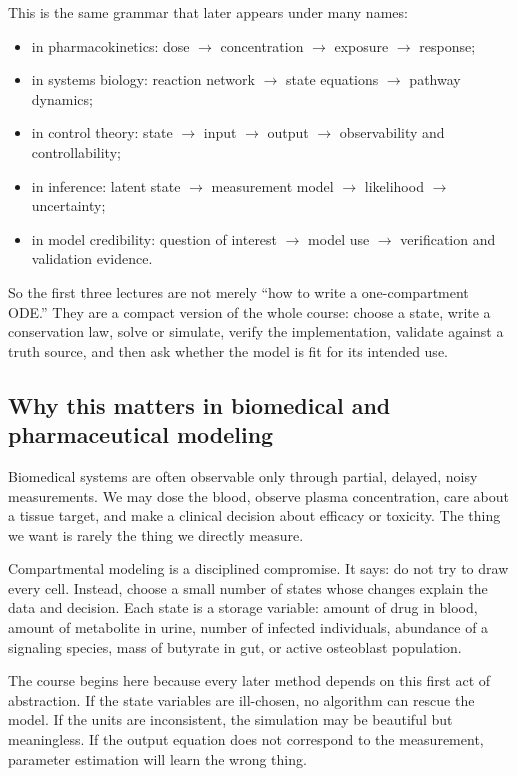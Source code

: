 \documentclass[a4paper]{article}
\begin{document}
This is the same grammar that later appears under many names:
\begin{itemize}[leftmargin=2em]
  \item in pharmacokinetics: dose \(\to\) concentration \(\to\) exposure \(\to\) response;
  \item in systems biology: reaction network \(\to\) state equations \(\to\) pathway dynamics;
  \item in control theory: state \(\to\) input \(\to\) output \(\to\) observability and controllability;
  \item in inference: latent state \(\to\) measurement model \(\to\) likelihood \(\to\) uncertainty;
  \item in model credibility: question of interest \(\to\) model use \(\to\) verification and validation evidence.
\end{itemize}

So the first three lectures are not merely ``how to write a one-compartment ODE.'' They are a compact version of the whole course: choose a state, write a conservation law, solve or simulate, verify the implementation, validate against a truth source, and then ask whether the model is fit for its intended use.

\subsection{Why this matters in biomedical and pharmaceutical modeling}

Biomedical systems are often observable only through partial, delayed, noisy measurements. We may dose the blood, observe plasma concentration, care about a tissue target, and make a clinical decision about efficacy or toxicity. The thing we want is rarely the thing we directly measure.

Compartmental modeling is a disciplined compromise. It says: do not try to draw every cell. Instead, choose a small number of states whose changes explain the data and decision. Each state is a storage variable: amount of drug in blood, amount of metabolite in urine, number of infected individuals, abundance of a signaling species, mass of butyrate in gut, or active osteoblast population.

The course begins here because every later method depends on this first act of abstraction. If the state variables are ill-chosen, no algorithm can rescue the model. If the units are inconsistent, the simulation may be beautiful but meaningless. If the output equation does not correspond to the measurement, parameter estimation will learn the wrong thing.
\end{document}
